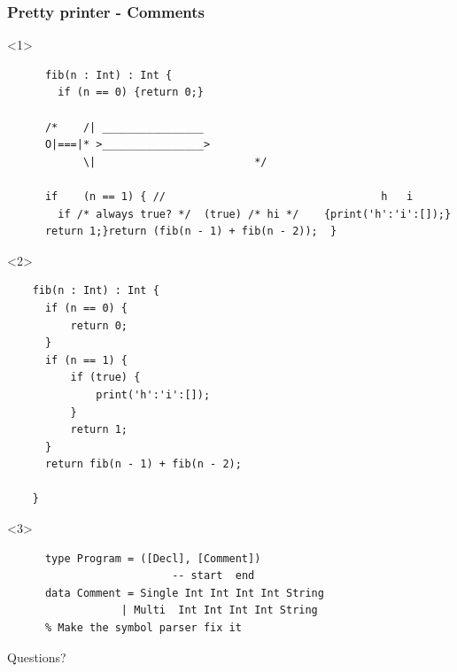 \documentclass{beamer}
\begin{document}
\begin{frame}[fragile]
  \frametitle{Pretty printer - Comments}
  \begin{onlyenv}<1>
    \begin{verbatim}
      fib(n : Int) : Int {
        if (n == 0) {return 0;}
      
      /*    /| ________________
      O|===|* >________________>
            \|                         */

      if    (n == 1) { //                                  h   i 
        if /* always true? */  (true) /* hi */    {print('h':'i':[]);}
      return 1;}return (fib(n - 1) + fib(n - 2));  }
    \end{verbatim}
  \end{onlyenv}

  \begin{onlyenv}<2>
    \begin{verbatim}
    fib(n : Int) : Int {
      if (n == 0) {
          return 0;
      }
      if (n == 1) {
          if (true) {
              print('h':'i':[]);
          }
          return 1;
      }
      return fib(n - 1) + fib(n - 2);

    }
    \end{verbatim}
  \end{onlyenv}


  \begin{onlyenv}<3>
    \begin{verbatim}
      type Program = ([Decl], [Comment])
                          -- start  end 
      data Comment = Single Int Int Int Int String
                  | Multi  Int Int Int Int String
      % Make the symbol parser fix it
    \end{verbatim}
  \end{onlyenv}
\end{frame}

\begin{frame}
  \begin{center}Questions?\end{center}
\end{frame}
\end{document}
